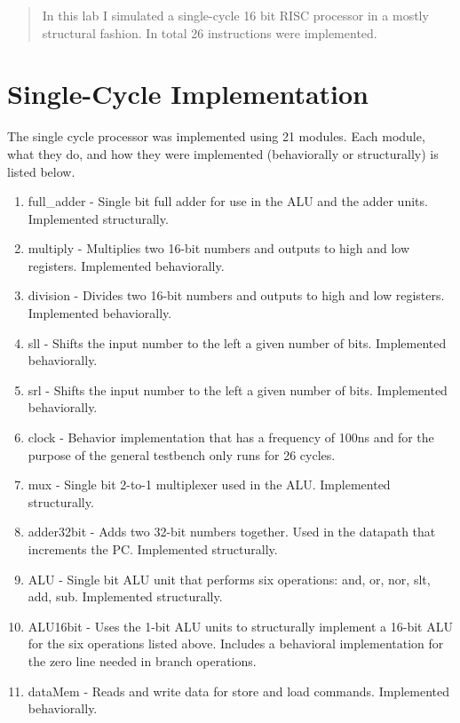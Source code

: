 \documentclass[11pt]{article}
\begin{document}
  

  \begin{abstract}
  In this lab I simulated a single-cycle 16 bit RISC processor in a mostly structural fashion. In total 26 instructions were implemented.
  \end{abstract}

  \section{Single-Cycle Implementation}

  The single cycle processor was implemented using 21 modules. Each module, what they do, and how they were implemented (behaviorally or structurally) is listed below.

  \begin{enumerate}
      \item full\_adder - Single bit full adder for use in the ALU and the adder units. Implemented structurally.
      \item multiply - Multiplies two 16-bit numbers and outputs to high and low registers. Implemented behaviorally.
      \item division - Divides two 16-bit numbers and outputs to high and low registers. Implemented behaviorally.
      \item sll - Shifts the input number to the left a given number of bits. Implemented behaviorally.
      \item srl - Shifts the input number to the left a given number of bits. Implemented behaviorally.
      \item clock - Behavior implementation that has a frequency of 100ns and for the purpose of the general testbench only runs for 26 cycles.
      \item mux - Single bit 2-to-1 multiplexer used in the ALU. Implemented structurally.
      \item adder32bit - Adds two 32-bit numbers together. Used in the datapath that increments the PC. Implemented structurally.
      \item ALU - Single bit ALU unit that performs six operations: and, or, nor, slt, add, sub. Implemented structurally.
      \item ALU16bit - Uses the 1-bit ALU units to structurally implement a 16-bit ALU for the six operations listed above. Includes a behavioral implementation for the zero line needed in branch operations.
      \item dataMem - Reads and write data for store and load commands. Implemented behaviorally.

\end{enumerate}
\end{document}
